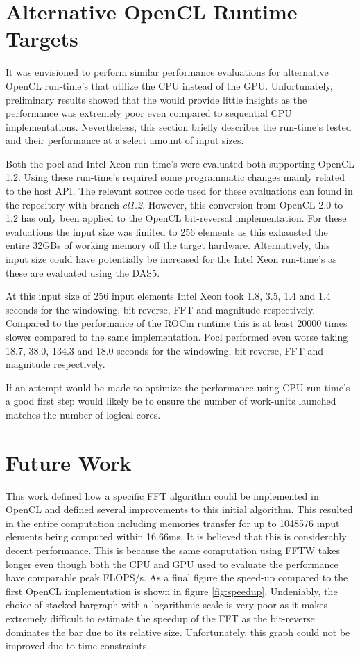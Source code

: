 \documentclass[conference]{IEEEtran}
\begin{document}
\section{Alternative OpenCL Runtime Targets}

It was envisioned to perform similar performance evaluations for alternative
OpenCL run-time's that utilize the CPU instead of the GPU. Unfortunately,
preliminary results showed that the would provide little insights as the
performance was extremely poor even compared to sequential CPU implementations.
Nevertheless, this section briefly describes the run-time's tested and their
performance at a select amount of input sizes.

Both the pocl\cite{Jskelinen2014} and Intel Xeon run-time's were
evaluated both supporting OpenCL 1.2. Using these run-time's required some
programmatic changes mainly related to the host API. The relevant source code
used for these evaluations can found in the repository with branch
\textit{cl1.2}. However, this conversion from OpenCL 2.0 to 1.2 has only been
applied to the OpenCL bit-reversal implementation. For these evaluations the
input size was limited to 256 elements as this exhausted the entire 32GBs of
working memory off the target hardware. Alternatively, this input size could
have potentially be increased for the Intel Xeon run-time's as these
are evaluated using the DAS5.

At this input size of 256 input elements Intel Xeon took 1.8, 3.5, 1.4 and 1.4
seconds for the windowing, bit-reverse, FFT and magnitude respectively.
Compared to the performance of the ROCm runtime this is at least 20000 times
slower compared to the same implementation. Pocl performed even worse taking
18.7, 38.0, 134.3 and 18.0 seconds for the windowing, bit-reverse, FFT and
magnitude respectively.

If an attempt would be made to optimize the performance using CPU run-time's
a good first step would likely be to ensure the number of work-units launched
matches the number of logical cores.

\section{Future Work}

This work defined how a specific FFT algorithm could be implemented in OpenCL
and defined several improvements to this initial algorithm. This resulted in
the entire computation including memories transfer for up to 1048576 input
elements being computed within 16.66ms. It is believed that this is
considerably decent performance. This is because the same computation using
FFTW takes longer even though both the CPU and GPU used to evaluate the
performance have comparable peak FLOPS/s. As a final figure the speed-up
compared to the first OpenCL implementation is shown in figure
\ref{fig:speedup}. Undeniably, the choice of stacked bargraph with a
logarithmic scale is very poor as it makes extremely difficult to estimate the
speedup of the FFT as the bit-reverse dominates the bar due to its relative
size. Unfortunately, this graph could not be improved due to time constraints.
\end{document}
